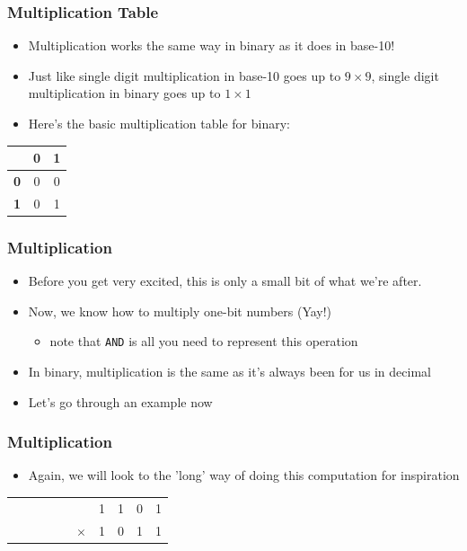 \documentclass{beamer}
\begin{document}
    	\begin{frame}
    		\frametitle{Multiplication Table}
    		\begin{itemize}
    			\item Multiplication works the same way in binary as it does in base-10!
    			\item Just like single digit multiplication in base-10 goes up to $ 9 \times 9 $, single digit multiplication in binary goes up to $ 1 \times 1$
    			\item Here's the basic multiplication table for binary:

    		\end{itemize}
    		
    		\centering
    		{\Large
    		\begin{tabular}{ |c|c|c| }
					\hline
				 	 & \textbf{0} & \textbf{1} \\ 
				 	\hline
				 	\textbf{0} & 0 & 0 \\  
				 	\hline
				 	\textbf{1} & 0 & 1 \\
				 	\hline 
					\end{tabular}
					}
    	\end{frame}
    	
    	\begin{frame}
    		\frametitle{Multiplication}
    		\begin{itemize}
    			\item Before you get very excited, this is only a small bit of what we're after.
    			\item Now, we know how to multiply one-bit numbers (Yay!)
    			\begin{itemize}
    				\item note that \texttt{AND} is all you need to represent this operation
    			\end{itemize}
    			\item In binary, multiplication is the same as it's always been for us in decimal
    			\item Let's go through an example now
    		\end{itemize}
    	\end{frame}
    	
    	
    	\begin{frame}
    		\frametitle{Multiplication}
    		
    		\begin{itemize}
    			\item Again, we will look to the 'long' way of doing this computation for inspiration
    		\end{itemize}

			\centering    		
    		
    		{\Huge
			\begin{tabular}{c@{\,}c@{\,}c@{\,}c@{\,}c@{\,}c@{\,}c@{\,}c@{\,}c@{\,}c}
					   & &  &  &  &  & 1 & 1 & 0 & 1 \\
					   & &  &  &  & $\times$ & 1 & 0 & 1 & 1 \\
					   \hline
					   
					
					
			\end{tabular}}
			\vfill
    	\end{frame}
    	
\end{document}
